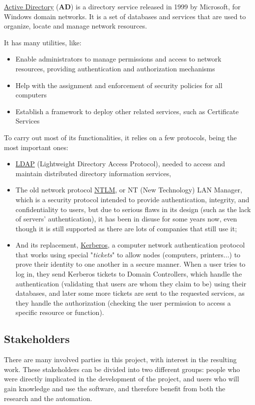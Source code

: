 \underline{Active Directory} (\textbf{AD}) is a directory service released in 1999 by Microsoft, for Windows domain networks. It is a set of databases and services that are used to organize, locate and manage network resources.

\pagebreak
It has many utilities, like:
\begin{itemize}
\item Enable administrators to manage permissions and access to network resources, providing authentication and authorization mechanisms
\item Help with the assignment and enforcement of security policies for all computers
\item Establish a framework to deploy other related services, such as Certificate Services
\end{itemize}

To carry out most of its functionalities, it relies on a few protocols, being the most important ones:
\begin{itemize}
\item \underline{LDAP} (Lightweight Directory Access Protocol), needed to access and maintain distributed directory information services,
\item The old network protocol \underline{NTLM}, or NT (New Technology) LAN Manager, which is a security protocol intended to provide authentication, integrity, and confidentiality to users, but due to serious flaws in its design (such as the lack of servers' authentication), it has been in disuse for some years now, even though it is still supported as there are lots of companies that still use it;
\item And its replacement, \underline{Kerberos}, a computer network authentication protocol that works using special "\textit{tickets}" to allow nodes (computers, printers...) to prove their identity to one another in a secure manner. When a user tries to log in, they send Kerberos tickets to Domain Controllers, which handle the authentication (validating that users are whom they claim to be) using their databases, and later some more tickets are sent to the requested services, as they handle the authorization (checking the user permission to access a specific resource or function).
\end{itemize} 

\subsection{Stakeholders}
\label{sec:stakeholders}
There are many involved parties in this project, with interest in the resulting work. These stakeholders can be divided into two different groups: people who were directly implicated in the development of the project, and users who will gain knowledge and use the software, and therefore benefit from both the research and the automation.

